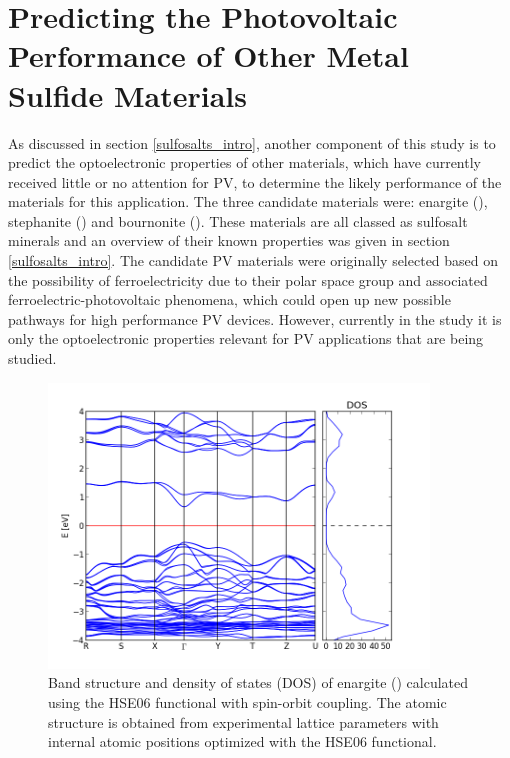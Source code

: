 \section{Predicting the Photovoltaic Performance of Other Metal Sulfide Materials}\label{sulfosalts_proj}
As discussed in section \ref{sulfosalts_intro}, another component of this study is to predict the optoelectronic properties of other materials, which have currently received little or no attention for PV, to determine the likely performance of the materials for this application. The three candidate materials were: enargite ({\enargite}), stephanite ({\stephanite}) and bournonite ({\bournonite}). These materials are all classed as sulfosalt minerals and an overview of their known properties was given in section \ref{sulfosalts_intro}. The candidate PV materials were originally selected based on the possibility of ferroelectricity due to their polar space group and associated ferroelectric-photovoltaic phenomena, which could open up new possible pathways for high performance PV devices. However, currently in the study it is only the optoelectronic properties relevant for PV applications that are being studied.

\begin{figure}[h!]
  \centering
    \includegraphics[width=0.9\textwidth]{figures/enargite_band_structure.png}
    \caption{Band structure and density of states (DOS) of enargite ({\enargite}) calculated using the HSE06 functional with spin-orbit coupling. The atomic structure is obtained from experimental lattice parameters with internal atomic positions optimized with the HSE06 functional.}
  \label{enargite_band_structure}
\end{figure}

